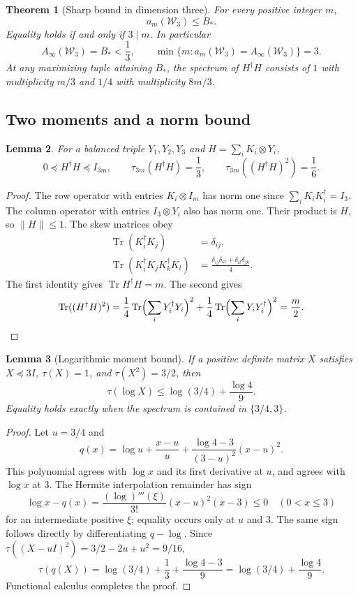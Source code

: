 \documentclass[11pt,a4paper]{article}
\newtheorem{theorem}{Theorem}
\newtheorem{lemma}[theorem]{Lemma}
\theoremstyle{remark}\newtheorem{remark}[theorem]{Remark}
\newcommand{\Tr}{\operatorname{Tr}}
\newcommand{\W}{\mathcal W}
\newcommand{\Ainf}{A_\infty}
\begin{document}
\begin{theorem}[Sharp bound in dimension three]\label{thm:sharp}
For every positive integer \(m\),
\[
 a_m(\W_3)\le B_*.
\]
Equality holds if and only if \(3\mid m\). In particular
\[
 \Ainf(\W_3)=B_*<\frac13,
 \qquad \min\{m:a_m(\W_3)=\Ainf(\W_3)\}=3.
\]
At any maximizing tuple attaining \(B_*\), the spectrum of \(H^\dagger H\) consists of \(1\) with multiplicity \(m/3\) and \(1/4\) with multiplicity \(8m/3\).
\end{theorem}

\subsection{Two moments and a norm bound}
\begin{lemma}\label{lem:moments}
For a balanced triple \(Y_1,Y_2,Y_3\) and
\(H=\sum_iK_i\otimes Y_i\),
\[
 0\preceq H^\dagger H\preceq I_{3m},\qquad
 \tau_{3m}(H^\dagger H)=\frac13,\qquad
 \tau_{3m}((H^\dagger H)^2)=\frac16 .
\]
\end{lemma}
\begin{proof}
The row operator with entries \(K_i\otimes I_m\) has norm one since
\(\sum_iK_iK_i^\dagger=I_3\). The column operator with entries \(I_3\otimes Y_i\) also has norm one. Their product is \(H\), so \(\|H\|\le1\).
The skew matrices obey
\begin{align}
 \Tr(K_i^\dagger K_j)&=\delta_{ij},\label{eq:gram}\\
 \Tr(K_i^\dagger K_jK_k^\dagger K_l)
   &=\frac{\delta_{ij}\delta_{kl}+\delta_{il}\delta_{jk}}4.
 \label{eq:fourtrace}
\end{align}
The first identity gives \(\Tr H^\dagger H=m\).
The second gives
\[
 \Tr((H^\dagger H)^2)
 =\frac14\Tr\Bigl(\sum_iY_i^\dagger Y_i\Bigr)^2
  +\frac14\Tr\Bigl(\sum_iY_iY_i^\dagger\Bigr)^2
 =\frac m2.
\]
\end{proof}

\begin{lemma}[Logarithmic moment bound]\label{lem:log}
If a positive definite matrix \(X\) satisfies
\(X\preceq3I\), \(\tau(X)=1\), and \(\tau(X^2)=3/2\), then
\[
 \tau(\log X)\le\log(3/4)+\frac{\log4}{9}.
\]
Equality holds exactly when the spectrum is contained in \(\{3/4,3\}\).
\end{lemma}
\begin{proof}
Let \(u=3/4\) and
\[
 q(x)=\log u+\frac{x-u}{u}
      +\frac{\log4-3}{(3-u)^2}(x-u)^2 .
\]
This polynomial agrees with \(\log x\) and its first derivative at \(u\), and agrees with \(\log x\) at \(3\). The Hermite interpolation remainder has sign
\[
 \log x-q(x)=\frac{(\log)'''(\xi)}{3!}(x-u)^2(x-3)\le0
 \quad(0<x\le3)
\]
for an intermediate positive \(\xi\); equality occurs only at \(u\) and \(3\).
The same sign follows directly by differentiating \(q-\log\).
Since
\(\tau((X-uI)^2)=3/2-2u+u^2=9/16\),
\[
 \tau(q(X))
 =\log(3/4)+\frac13+\frac{\log4-3}{9}
 =\log(3/4)+\frac{\log4}{9}.
\]
Functional calculus completes the proof.
\end{proof}
\end{document}
